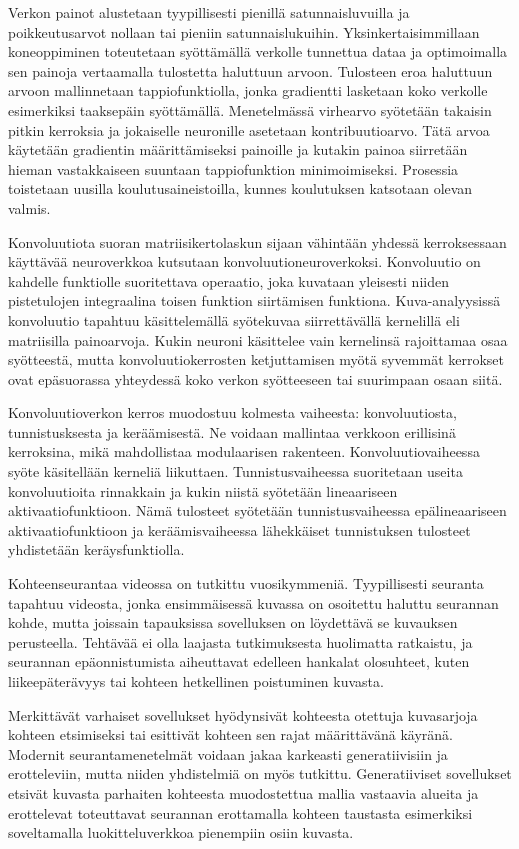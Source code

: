 Verkon painot alustetaan tyypillisesti pienillä satunnaisluvuilla ja poikkeutusarvot nollaan
tai pieniin satunnaislukuihin. Yksinkertaisimmillaan koneoppiminen toteutetaan syöttämällä
verkolle tunnettua dataa ja optimoimalla sen painoja vertaamalla tulostetta haluttuun arvoon.
Tulosteen eroa haluttuun arvoon mallinnetaan tappiofunktiolla, jonka gradientti lasketaan
koko verkolle esimerkiksi taaksepäin syöttämällä. Menetelmässä virhearvo syötetään takaisin
pitkin kerroksia ja jokaiselle neuronille asetetaan kontribuutioarvo. Tätä arvoa käytetään
gradientin määrittämiseksi painoille ja kutakin painoa siirretään hieman vastakkaiseen suuntaan
tappiofunktion minimoimiseksi. Prosessia toistetaan uusilla koulutusaineistoilla, kunnes
koulutuksen katsotaan olevan valmis.

Konvoluutiota suoran matriisikertolaskun sijaan vähintään yhdessä kerroksessaan käyttävää
neuroverkkoa kutsutaan konvoluutioneuroverkoksi. Konvoluutio on kahdelle funktiolle suoritettava
operaatio, joka kuvataan yleisesti niiden pistetulojen integraalina toisen funktion
siirtämisen funktiona. Kuva-analyysissä konvoluutio tapahtuu käsittelemällä syötekuvaa
siirrettävällä kernelillä eli matriisilla painoarvoja. Kukin neuroni käsittelee vain
kernelinsä rajoittamaa osaa syötteestä, mutta konvoluutiokerrosten ketjuttamisen myötä
syvemmät kerrokset ovat epäsuorassa yhteydessä koko verkon syötteeseen tai suurimpaan
osaan siitä.

Konvoluutioverkon kerros muodostuu kolmesta vaiheesta: konvoluutiosta, tunnistusksesta ja
keräämisestä. Ne voidaan mallintaa verkkoon erillisinä kerroksina, mikä mahdollistaa
modulaarisen rakenteen. Konvoluutiovaiheessa syöte käsitellään kerneliä liikuttaen.
Tunnistusvaiheessa suoritetaan useita konvoluutioita rinnakkain ja kukin niistä syötetään
lineaariseen aktivaatiofunktioon. Nämä tulosteet syötetään tunnistusvaiheessa epälineaariseen
aktivaatiofunktioon ja keräämisvaiheessa lähekkäiset tunnistuksen tulosteet yhdistetään
keräysfunktiolla.

Kohteenseurantaa videossa on tutkittu vuosikymmeniä. Tyypillisesti seuranta tapahtuu videosta,
jonka ensimmäisessä kuvassa on osoitettu haluttu seurannan kohde, mutta joissain tapauksissa
sovelluksen on löydettävä se kuvauksen perusteella. Tehtävää ei olla laajasta tutkimuksesta
huolimatta ratkaistu, ja seurannan epäonnistumista aiheuttavat edelleen hankalat olosuhteet,
kuten liikeepäterävyys tai kohteen hetkellinen poistuminen kuvasta.

Merkittävät varhaiset sovellukset hyödynsivät kohteesta otettuja kuvasarjoja kohteen etsimiseksi
tai esittivät kohteen sen rajat määrittävänä käyränä. Modernit seurantamenetelmät voidaan jakaa
karkeasti generatiivisiin ja erotteleviin, mutta niiden yhdistelmiä on myös tutkittu. Generatiiviset
sovellukset etsivät kuvasta parhaiten kohteesta muodostettua mallia vastaavia alueita ja erottelevat
toteuttavat seurannan erottamalla kohteen taustasta esimerkiksi soveltamalla luokitteluverkkoa
pienempiin osiin kuvasta.

